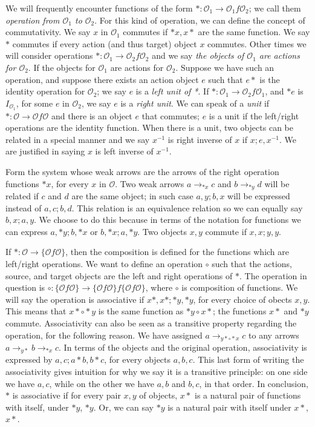 \documentclass [12pt]{book}
\begin{document}
We will frequently encounter functions of the form $*:\mathcal O_1\rightarrow\mathcal O_1f\mathcal O_2$; we call them \textit{operation from $\mathcal O_1$ to $\mathcal O_2$}. For this kind of operation, we can define the concept of commutativity. We say $x$ in $\mathcal O_1$ commutes if $*x,x*$ are the same function. We say $*$ commutes if every action (and thus target) object $x$ commutes. Other times we will consider operations $*:\mathcal O_1\rightarrow\mathcal O_2f\mathcal O_2$ and we say \textit{the objects of $\mathcal O_1$ are actions for $\mathcal O_2$}. If the objects for $\mathcal O_1$ are actions for $\mathcal O_2$. Suppose we have such an operation, and suppose there exists an action object $e$ such that $e*$ is the identity operation for $\mathcal O_2$; we say $e$ is a \textit{left unit of *}. If $*:\mathcal O_1\rightarrow\mathcal O_2f\mathcal O_1$, and $*e$ is $I_{\mathcal O_1}$, for some $e$ in $\mathcal O_2$, we say $e$ is a \textit{right unit}. We can speak of a \textit{unit} if $*:\mathcal O\rightarrow\mathcal Of\mathcal O$ and there is an object $e$ that commutes; $e$ is a unit if the left/right operations are the identity function. When there is a unit, two objects can be related in a special manner and we say $x^{-1}$ is right inverse of $x$ if $x;e,x^{-1}$. We are justified in saying $x$ is left inverse of $x^{-1}$.

Form the system whose weak arrows are the arrows of the right operation functions $*x$, for every $x$ in $\mathcal{O}$. Two weak arrows $a\rightarrow_{*x}c$ and $b\rightarrow_{*y}d$ will be related if $c$ and $d$ are the same object; in such case $a,y;b,x$ will be expressed instead of $a,c;b,d$. This relation is an equivalence relation so we can equally say $b,x;a,y$. We choose to do this because in terms of the notation for functions we can express $a,*y;b,*x$ or $b,*x;a,*y$. Two objects $x,y$ commute if $x,x;y,y$.

If $*:\mathcal O\rightarrow\{\mathcal Of\mathcal O\}$, then the composition is defined for the functions which are left/right operations. We want to define an operation $\circ$ such that the actions, source, and target objects are the left and right operations of $*$. The operation in question is $\circ:\{\mathcal Of\mathcal O\}\rightarrow\{\mathcal Of\mathcal O\}f\{\mathcal Of\mathcal O\}$, where $\circ$ is composition of functions. We will say the operation is associative if $x*,x*;*y,*y$, for every choice of obects $x,y$. This means that $x*\circ*y$ is the same function as $*y\circ x*$; the functions $x*$ and $*y$ commute. Associativity can also be seen as a transitive property regarding the operation, for the following reason. We have assigned $a\rightarrow_{y*\circ*x} c$ to any arrows $a\rightarrow_{y*}b\rightarrow_{*x}c$. In terms of the objects and the original operation, associativity is expressed by $a,c;a*b,b*c$, for every objects $a,b,c$. This last form of writing the associativity gives intuition for why we say it is a transitive principle: on one side we have $a,c$, while on the other we have $a,b$ and $b,c$, in that order. In conclusion, $*$ is associative if for every pair $x,y$ of objects, $x*$ is a natural pair of functions with itself, under $*y$, $*y$. Or, we can say $*y$ is a natural pair with itself under $x*$, $x*$.
\end{document}
